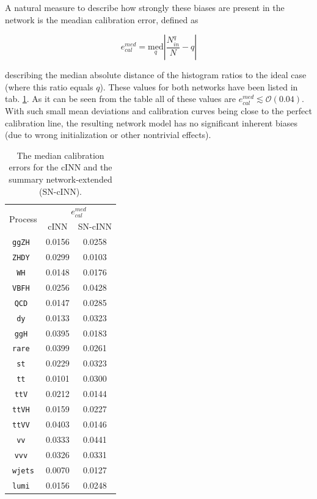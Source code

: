 A natural measure to describe how strongly these biases are present in the network is the meadian calibration error, defined as

\begin{equation*}
	e^{med}_{cal} = \underset{q}{\text{med}} \left|\frac{N^q_{in}}{N} - q\right|
\end{equation*}

describing the median absolute distance of the histogram ratios to the ideal case (where this ratio equals $q$). These values for both networks have been listed in tab. \ref{tab:ecal_med}. As it can be seen from the table all of these values are $e^{med}_{cal}\lesssim\mathcal{O}(0.04)$. With such small mean deviations and calibration curves being close to the perfect calibration line, the resulting network model has no significant inherent biases (due to wrong initialization or other nontrivial effects).

\begin{table}[h!]
	\centering
	\begin{tabular}{ccc}
		\multirow{2}{*}{Process}& \multicolumn{2}{c}{$e^{med}_{cal}$} \\
		 & cINN & SN-cINN \\
		\hline
		\texttt{ggZH }   & 0.0156    &    0.0258  \\
		\texttt{ZHDY }   & 0.0299    &    0.0103  \\
		\texttt{WH   }   & 0.0148    &    0.0176  \\
		\texttt{VBFH }   & 0.0256    &    0.0428  \\
		\texttt{QCD  }   & 0.0147    &    0.0285  \\
		\texttt{dy   }   & 0.0133    &    0.0323  \\
		\texttt{ggH  }   & 0.0395    &    0.0183  \\
		\texttt{rare }   & 0.0399    &    0.0261  \\
		\texttt{st   }   & 0.0229    &    0.0323  \\
		\texttt{tt   }   & 0.0101    &    0.0300  \\
		\texttt{ttV  }   & 0.0212    &    0.0144  \\
		\texttt{ttVH }   & 0.0159    &    0.0227  \\
		\texttt{ttVV }   & 0.0403    &    0.0146  \\
		\texttt{vv   }   & 0.0333    &    0.0441  \\
		\texttt{vvv  }   & 0.0326    &    0.0331  \\
		\texttt{wjets}   & 0.0070    &    0.0127  \\
		\texttt{lumi }   & 0.0156    &    0.0248  \\
		\hline
	\end{tabular}
	\caption{The median calibration errors for the cINN and the summary network-extended (SN-cINN).}
	\label{tab:ecal_med}
\end{table}

